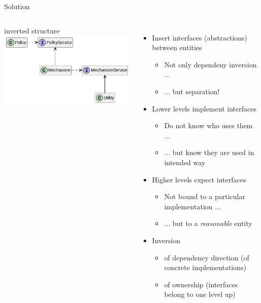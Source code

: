 \begin{frame}{Solution}
\begin{columns}
\begin{center}
\vspace{6pt}
inverted structure\\
\includegraphics[width=\linewidth]{./gfx/17-uml-dependency_injection-applied}
\end{center}
%
\begin{itemize}
\item Insert interfaces (abstractions) between entities
	\begin{itemize}
	\item Not only dependeny inversion ...
	\item ... but separation!
	\end{itemize}
\item Lower levels implement interfaces
	\begin{itemize}
	\item[\Thus] Do not know who uses them ...
	\item[\Thus] ... but know they are used in intended way
	\end{itemize}
\item Higher levels expect interfaces
	\begin{itemize}
	\item[\Thus] Not bound to a particular implementation ...
	\item[\Thus] ... but to a \emph{reasonable} entity
	\end{itemize}
\item Inversion
	\begin{itemize}
	\item of dependency direction (of concrete implementations)
	\item of ownership (interfaces belong to one level up)
	\end{itemize}
\end{itemize}
\end{columns}
%
\end{frame}

